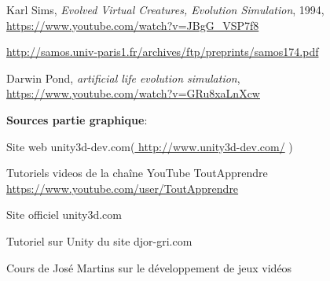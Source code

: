 \begin{thebibliography}{99}



 

Karl Sims,
 \emph{Evolved Virtual Creatures, Evolution Simulation}, 1994,
 \url{https://www.youtube.com/watch?v=JBgG\_VSP7f8}

 \url{http://samos.univ-paris1.fr/archives/ftp/preprints/samos174.pdf}

Darwin Pond,
\emph{artificial life evolution simulation},
\url{https://www.youtube.com/watch?v=GRu8xaLnXcw}


 \vspace{3\baselineskip}
\textbf{ Sources partie graphique}:

 Site web unity3d-dev.com(\url{ http://www.unity3d-dev.com/}  )

Tutoriels videos de la chaîne YouTube ToutApprendre \url{https://www.youtube.com/user/ToutApprendre}

Site officiel unity3d.com

Tutoriel sur Unity du site djor-gri.com

Cours de José Martins sur le développement de jeux vidéos
\end{thebibliography}

